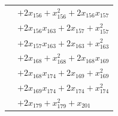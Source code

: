\begin{longtable}{@{}r@{\;}l@{}}
 & \(\displaystyle +2x_{156} +x_{156}^{2} +2x_{156}x_{157}\) \\
 & \(\displaystyle +2x_{156}x_{163} +2x_{157} +x_{157}^{2}\) \\
 & \(\displaystyle +2x_{157}x_{163} +2x_{163} +x_{163}^{2}\) \\
 & \(\displaystyle +2x_{168} +x_{168}^{2} +2x_{168}x_{169}\) \\
 & \(\displaystyle +2x_{168}x_{174} +2x_{169} +x_{169}^{2}\) \\
 & \(\displaystyle +2x_{169}x_{174} +2x_{174} +x_{174}^{2}\) \\
 & \(\displaystyle +2x_{179} +x_{179}^{2} +x_{201}\) \\[3pt]
\end{longtable}
\endgroup
